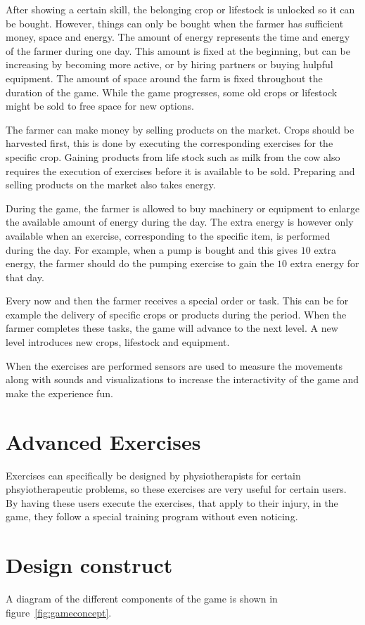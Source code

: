 \documentclass[a4paper,11pt,notitlepage]{report}
\begin{document}
After showing a certain skill, the belonging crop or lifestock is unlocked so it can be bought. However, things can only be bought when the farmer has sufficient money, space and energy. The amount of energy represents the time and energy of the farmer during one day. This amount is fixed at the beginning, but can be increasing by becoming more active, or by hiring partners or buying hulpful equipment. The amount of space around the farm is fixed throughout the duration of the game. While the game progresses, some old crops or lifestock might be sold to free space for new options.

The farmer can make money by selling products on the market. Crops should be harvested first, this is done by executing the corresponding exercises for the specific crop. Gaining products from life stock such as milk from the cow also requires the execution of exercises before it is available to be sold. Preparing and selling products on the market also takes energy.

During the game, the farmer is allowed to buy machinery or equipment to enlarge the available amount of energy during the day. The extra energy is however only available when an exercise, corresponding to the specific item, is performed during the day. For example, when a pump is bought and this gives $10$ extra energy, the farmer should do the pumping exercise to gain the $10$ extra energy for that day. 

Every now and then the farmer receives a special order or task. This can be for example the delivery of specific crops or products during the period. When the farmer completes these tasks, the game will advance to the next level. A new level introduces new crops, lifestock and equipment.

When the exercises are performed sensors are used to measure the movements along with sounds and visualizations to increase the interactivity of the game and make the experience fun.

\section{Advanced Exercises}
Exercises can specifically be designed by physiotherapists for certain phsyiotherapeutic problems, so these exercises are very useful for certain users. By having these users execute the exercises, that apply to their injury, in the game, they follow a special training program without even noticing.  

\section{Design construct}
A diagram of the different components of the game is shown in figure~\ref{fig:gameconcept}.
\end{document}
